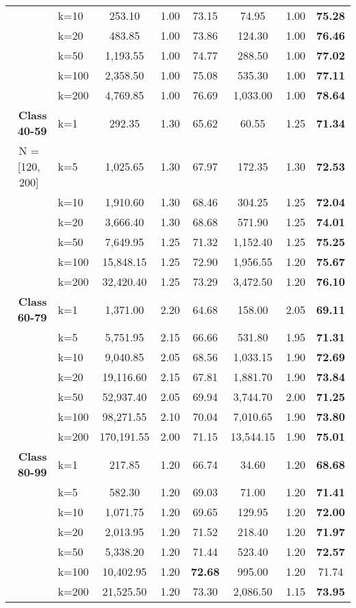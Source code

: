 \begin{table}[htbp]
\begin{tabular}{|l|l|c|c|c|c|c|c|}
     & k=10 & 253.10 & 1.00 & 73.15 & 74.95 & 1.00 & \textbf{75.28} \\ 
     & k=20 & 483.85 & 1.00 & 73.86 & 124.30 & 1.00 & \textbf{76.46} \\ 
     & k=50 & 1,193.55 & 1.00 & 74.77 & 288.50 & 1.00 & \textbf{77.02} \\ 
     & k=100 & 2,358.50 & 1.00 & 75.08 & 535.30 & 1.00 & \textbf{77.11} \\ 
     & k=200 & 4,769.85 & 1.00 & 76.69 & 1,033.00 & 1.00 & \textbf{78.64} \\ \hline
    \multicolumn{1}{|r|}{\textbf{Class 40-59}} & k=1 & 292.35 & 1.30 & 65.62 & 60.55 & 1.25 & \textbf{71.34} \\ 
    \multicolumn{1}{|c|}{N = [120, 200]} & k=5 & 1,025.65 & 1.30 & 67.97 & 172.35 & 1.30 & \textbf{72.53} \\ 
     & k=10 & 1,910.60 & 1.30 & 68.46 & 304.25 & 1.25 & \textbf{72.04} \\ 
     & k=20 & 3,666.40 & 1.30 & 68.68 & 571.90 & 1.25 & \textbf{74.01} \\ 
     & k=50 & 7,649.95 & 1.25 & 71.32 & 1,152.40 & 1.25 & \textbf{75.25} \\ 
     & k=100 & 15,848.15 & 1.25 & 72.90 & 1,956.55 & 1.20 & \textbf{75.67} \\ 
     & k=200 & 32,420.40 & 1.25 & 73.29 & 3,472.50 & 1.20 & \textbf{76.10} \\ \hline
    \multicolumn{1}{|r|}{\textbf{Class 60-79}} & k=1 & 1,371.00 & 2.20 & 64.68 & 158.00 & 2.05 & \textbf{69.11} \\ 
     & k=5 & 5,751.95 & 2.15 & 66.66 & 531.80 & 1.95 & \textbf{71.31} \\ 
     & k=10 & 9,040.85 & 2.05 & 68.56 & 1,033.15 & 1.90 & \textbf{72.69} \\ 
     & k=20 & 19,116.60 & 2.15 & 67.81 & 1,881.70 & 1.90 & \textbf{73.84} \\ 
     & k=50 & 52,937.40 & 2.05 & 69.94 & 3,744.70 & 2.00 & \textbf{71.25} \\ 
     & k=100 & 98,271.55 & 2.10 & 70.04 & 7,010.65 & 1.90 & \textbf{73.80} \\ 
     & k=200 & 170,191.55 & 2.00 & 71.15 & 13,544.15 & 1.90 & \textbf{75.01} \\ \hline
    \multicolumn{1}{|r|}{\textbf{Class 80-99}} & k=1 & 217.85 & 1.20 & 66.74 & 34.60 & 1.20 & \textbf{68.68} \\ 
     & k=5 & 582.30 & 1.20 & 69.03 & 71.00 & 1.20 & \textbf{71.41} \\ 
     & k=10 & 1,071.75 & 1.20 & 69.65 & 129.95 & 1.20 & \textbf{72.00} \\ 
     & k=20 & 2,013.95 & 1.20 & 71.52 & 218.40 & 1.20 & \textbf{71.97} \\ 
     & k=50 & 5,338.20 & 1.20 & 71.44 & 523.40 & 1.20 & \textbf{72.57} \\ 
     & k=100 & 10,402.95 & 1.20 & \textbf{72.68} & 995.00 & 1.20 & 71.74 \\ 
     & k=200 & 21,525.50 & 1.20 & 73.30 & 2,086.50 & 1.15 & \textbf{73.95} \\ \hline
    \end{tabular}
    \label{results:usecase_summary}
    \end{table}
    
